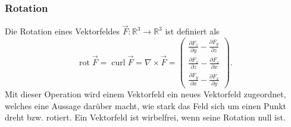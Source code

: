 \subsubsection{Rotation}
Die Rotation eines Vektorfeldes $\vec{F}:\mathbb{R}^3 \rightarrow \mathbb{R}^3$ ist definiert als
\[
\renewcommand{\arraystretch}{1.9} 
\operatorname{rot}\vec{F} = 
\operatorname{curl}\vec{F}
=\nabla\times\vec{F}
= \begin{pmatrix}
	\displaystyle
	\frac{\partial F_z}{\partial y} -\frac{\partial F_y}{\partial z}\\
	\displaystyle
	\frac{\partial F_x}{\partial z} -\frac{\partial F_z}{\partial x}\\
	\displaystyle
	\frac{\partial F_y}{\partial x} -\frac{\partial F_x}{\partial y}
\end{pmatrix}
. \]
Mit dieser Operation wird einem Vektorfeld ein neues Vektorfeld zugeordnet, welches eine Aussage darüber macht, wie stark das Feld sich um einen Punkt dreht bzw. rotiert.
Ein Vektorfeld ist wirbelfrei, wenn seine Rotation null ist.
